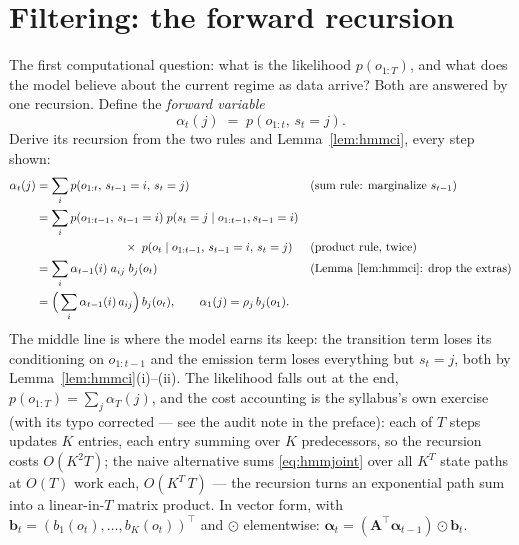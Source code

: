 \documentclass[11pt]{article}
\numberwithin{equation}{section}
\theoremstyle{plain}
\theoremstyle{definition}
\theoremstyle{remark}
\newcounter{exercise}
\newcommand{\T}{\top}
\newcommand{\bA}{\bm{A}}
\begin{document}
\section{Filtering: the forward recursion}\label{sec:forward}

The first computational question: what is the likelihood $p(o_{1:T})$, and what does the model believe about the current regime as data arrive? Both are answered by one recursion. Define the \emph{forward variable}
\begin{equation}
\alpha_t(j) \;=\; p(o_{1:t},\, s_t = j).
\label{eq:alphadef}
\end{equation}
Derive its recursion from the two rules and Lemma~\ref{lem:hmmci}, every step shown:
\begin{align}
\alpha_t(j)
&= \sum_{i} p(o_{1:t},\, s_{t-1} = i,\, s_t = j)
&&\text{(sum rule: marginalize $s_{t-1}$)}\notag\\
&= \sum_{i} p(o_{1:t-1},\, s_{t-1} = i)\; p(s_t = j \mid o_{1:t-1}, s_{t-1} = i)\notag\\
&\hspace{7.5em} \times\; p(o_t \mid o_{1:t-1},\, s_{t-1} = i,\, s_t = j)
&&\text{(product rule, twice)}\notag\\
&= \sum_{i} \alpha_{t-1}(i)\; a_{ij}\; b_j(o_t)
&&\text{(Lemma \ref{lem:hmmci}: drop the extras)}\notag\\
&= \Big( \sum_i \alpha_{t-1}(i)\, a_{ij} \Big)\, b_j(o_t),
\qquad \alpha_1(j) = \rho_j\, b_j(o_1).
\label{eq:forward}
\end{align}
The middle line is where the model earns its keep: the transition term loses its conditioning on $o_{1:t-1}$ and the emission term loses everything but $s_t = j$, both by Lemma~\ref{lem:hmmci}(i)--(ii). The likelihood falls out at the end, $p(o_{1:T}) = \sum_j \alpha_T(j)$, and the cost accounting is the syllabus's own exercise (with its typo corrected --- see the audit note in the preface): each of $T$ steps updates $K$ entries, each entry summing over $K$ predecessors, so the recursion costs $O(K^2 T)$; the naive alternative sums \eqref{eq:hmmjoint} over all $K^T$ state paths at $O(T)$ work each, $O(K^T\, T)$ --- the recursion turns an exponential path sum into a linear-in-$T$ matrix product. In vector form, with $\bm b_t = (b_1(o_t), \dots, b_K(o_t))^\T$ and $\odot$ elementwise: $\bm\alpha_t = (\bA^\T \bm\alpha_{t-1}) \odot \bm b_t$.
\end{document}
